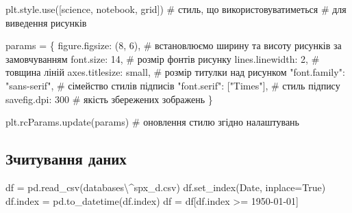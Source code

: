 \documentclass[
  letterpaper,
]{report}
\newenvironment{Shaded}{\begin{snugshade}}{\end{snugshade}}
\newcommand{\CommentTok}[1]{\textcolor[rgb]{0.37,0.37,0.37}{#1}}
\newcommand{\DecValTok}[1]{\textcolor[rgb]{0.68,0.00,0.00}{#1}}
\newcommand{\NormalTok}[1]{\textcolor[rgb]{0.00,0.23,0.31}{#1}}
\newcommand{\OperatorTok}[1]{\textcolor[rgb]{0.37,0.37,0.37}{#1}}
\newcommand{\StringTok}[1]{\textcolor[rgb]{0.13,0.47,0.30}{#1}}
\newcommand{\VariableTok}[1]{\textcolor[rgb]{0.07,0.07,0.07}{#1}}
\begin{document}
\begin{Shaded}
\begin{Highlighting}[]
\NormalTok{plt.style.use([}\StringTok{\textquotesingle{}science\textquotesingle{}}\NormalTok{, }\StringTok{\textquotesingle{}notebook\textquotesingle{}}\NormalTok{, }\StringTok{\textquotesingle{}grid\textquotesingle{}}\NormalTok{]) }\CommentTok{\# стиль, що використовуватиметься}
                                               \CommentTok{\# для виведення рисунків}

\NormalTok{params }\OperatorTok{=}\NormalTok{ \{}
    \StringTok{\textquotesingle{}figure.figsize\textquotesingle{}}\NormalTok{: (}\DecValTok{8}\NormalTok{, }\DecValTok{6}\NormalTok{),         }\CommentTok{\# встановлюємо ширину та висоту рисунків за замовчуванням}
    \StringTok{\textquotesingle{}font.size\textquotesingle{}}\NormalTok{: }\DecValTok{14}\NormalTok{,                  }\CommentTok{\# розмір фонтів рисунку}
    \StringTok{\textquotesingle{}lines.linewidth\textquotesingle{}}\NormalTok{: }\DecValTok{2}\NormalTok{,             }\CommentTok{\# товщина ліній}
    \StringTok{\textquotesingle{}axes.titlesize\textquotesingle{}}\NormalTok{: }\StringTok{\textquotesingle{}small\textquotesingle{}}\NormalTok{,        }\CommentTok{\# розмір титулки над рисунком}
    \StringTok{"font.family"}\NormalTok{: }\StringTok{"sans{-}serif"}\NormalTok{,      }\CommentTok{\# сімейство стилів підписів }
    \StringTok{"font.serif"}\NormalTok{: [}\StringTok{"Times"}\NormalTok{],          }\CommentTok{\# стиль підпису}
    \StringTok{\textquotesingle{}savefig.dpi\textquotesingle{}}\NormalTok{: }\DecValTok{300}                \CommentTok{\# якість збережених зображень}
\NormalTok{\}}

\NormalTok{plt.rcParams.update(params)           }\CommentTok{\# оновлення стилю згідно налаштувань}
\end{Highlighting}
\end{Shaded}

\hypertarget{ux437ux447ux438ux442ux443ux432ux430ux43dux43dux44f-ux434ux430ux43dux438ux445}{%
\subsection{Зчитування
даних}\label{ux437ux447ux438ux442ux443ux432ux430ux43dux43dux44f-ux434ux430ux43dux438ux445}}

\begin{Shaded}
\begin{Highlighting}[]
\NormalTok{df }\OperatorTok{=}\NormalTok{ pd.read\_csv(}\StringTok{\textquotesingle{}databases\textbackslash{}\^{}spx\_d.csv\textquotesingle{}}\NormalTok{)}
\NormalTok{df.set\_index(}\StringTok{\textquotesingle{}Date\textquotesingle{}}\NormalTok{, inplace}\OperatorTok{=}\VariableTok{True}\NormalTok{)}
\NormalTok{df.index }\OperatorTok{=}\NormalTok{ pd.to\_datetime(df.index)}
\NormalTok{df }\OperatorTok{=}\NormalTok{ df[df.index }\OperatorTok{\textgreater{}=} \StringTok{\textquotesingle{}1950{-}01{-}01\textquotesingle{}}\NormalTok{]}
\end{Highlighting}
\end{Shaded}
\end{document}
